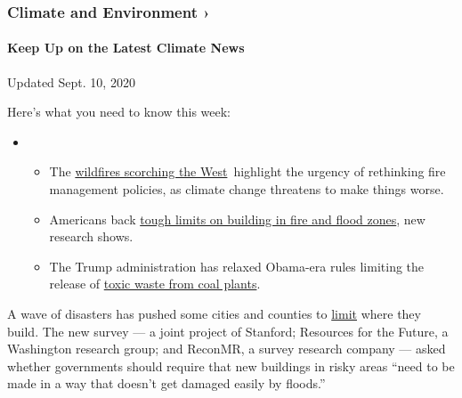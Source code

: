 \href{\%3Ca\%20href=\%22https://www.nytimes3xbfgragh.onion/section/climate?action=click\&pgtype=Article\&state=default\&region=MAIN_CONTENT_1\&context=storylines_keepup\%22\%3Ehttps://www.nytimes3xbfgragh.onion/section/climate?action=click\&pgtype=Article\&state=default\&region=MAIN_CONTENT_1\&context=storylines_keepup\%3C/a\%3E}{}

\hypertarget{climate-and-environment-}{%
\subsubsection{Climate and Environment
›}\label{climate-and-environment-}}

\hypertarget{keep-up-on-the-latest-climate-news}{%
\paragraph{Keep Up on the Latest Climate
News}\label{keep-up-on-the-latest-climate-news}}

Updated Sept. 10, 2020

Here's what you need to know this week:

\begin{itemize}
\item
  \begin{itemize}
  \tightlist
  \item
    The
    \href{https://www.nytimes3xbfgragh.onion/2020/09/10/climate/wildfires-climate-policy.html?action=click\&pgtype=Article\&state=default\&region=MAIN_CONTENT_1\&context=storylines_keepup}{wildfires
    scorching the West}~highlight the urgency of rethinking fire
    management policies, as climate change threatens to make things
    worse.
  \item
    Americans back
    \href{https://www.nytimes3xbfgragh.onion/2020/09/04/climate/flood-fire-building-restrictions.html?action=click\&pgtype=Article\&state=default\&region=MAIN_CONTENT_1\&context=storylines_keepup}{tough
    limits on building in fire and flood zones}, new research shows.
  \item
    The Trump administration has relaxed Obama-era rules limiting the
    release of
    \href{https://www.nytimes3xbfgragh.onion/2020/08/31/climate/trump-coal-plants.html?action=click\&pgtype=Article\&state=default\&region=MAIN_CONTENT_1\&context=storylines_keepup}{toxic
    waste from coal plants}.
  \end{itemize}
\end{itemize}

A wave of disasters has pushed some cities and counties to
\href{https://www.nytimes3xbfgragh.onion/2019/11/19/climate/climate-real-estate-developers.html}{limit}
where they build. The new survey --- a joint project of Stanford;
Resources for the Future, a Washington research group; and ReconMR, a
survey research company --- asked whether governments should require
that new buildings in risky areas ``need to be made in a way that
doesn't get damaged easily by floods.''


